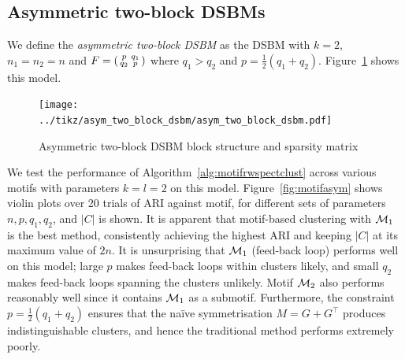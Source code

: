 \subsection{Asymmetric two-block DSBMs} \label{sec:motif_asymm_dsbms}

We define the \emph{asymmetric two-block DSBM} as the DSBM with $k=2$, $n_1=n_2=n$ and $F = \begin{psmallmatrix} p & q_1 \\ q_2 & p \end{psmallmatrix}$ where $q_1 > q_2$ and $p = \frac{1}{2}(q_1+q_2)$. Figure~\ref{fig:asym_two_block_dsbm} shows this model.


\begin{figure}[H]
	\centering
	\texttt{[image: ../tikz/asym\_two\_block\_dsbm/asym\_two\_block\_dsbm.pdf]}
	\caption{Asymmetric two-block DSBM block structure and sparsity matrix}
	\label{fig:asym_two_block_dsbm}
\end{figure}

We test the performance of Algorithm~\ref{alg:motifrwspectclust} across various motifs with parameters $k=l=2$ on this model.
Figure~\ref{fig:motifasym} shows violin plots over 20 trials of ARI against motif, for different sets of parameters $n,p,q_1,q_2$, and $|C|$ is shown.
It is apparent that motif-based clustering with $\mathcal{M}_1$ is the best method, consistently achieving the highest ARI and keeping $|C|$ at its maximum value of $2n$.
It is unsurprising that $\mathcal{M}_1$ (feed-back loop) performs well on this model; large $p$ makes feed-back loops within clusters likely, and small $q_2$ makes feed-back loops spanning the clusters unlikely. Motif $\mathcal{M}_2$ also performs reasonably well since it contains $\mathcal{M}_1$ as a submotif.
Furthermore, the constraint $p = \frac{1}{2}(q_1+q_2)$ ensures that the na\"ive symmetrisation $M=G+G^\top$ produces indistinguishable clusters, and hence the traditional method performs extremely poorly.



